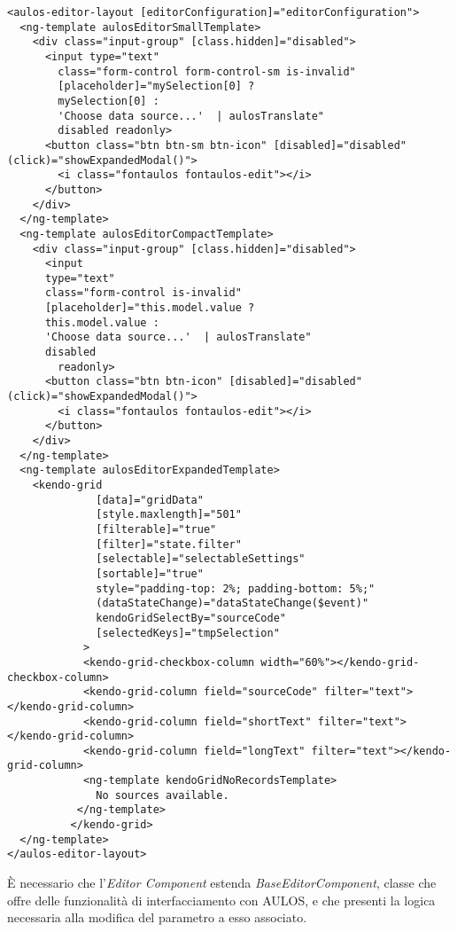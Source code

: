 \begin{lstlisting}[caption={source-editor.component.html},style=html]
<aulos-editor-layout [editorConfiguration]="editorConfiguration">
  <ng-template aulosEditorSmallTemplate>
    <div class="input-group" [class.hidden]="disabled">
      <input type="text" 
        class="form-control form-control-sm is-invalid"
        [placeholder]="mySelection[0] ? 
        mySelection[0] : 
        'Choose data source...'  | aulosTranslate" 
        disabled readonly>
      <button class="btn btn-sm btn-icon" [disabled]="disabled" (click)="showExpandedModal()">
        <i class="fontaulos fontaulos-edit"></i>
      </button>
    </div>
  </ng-template>
  <ng-template aulosEditorCompactTemplate>
    <div class="input-group" [class.hidden]="disabled">
      <input 
      type="text" 
      class="form-control is-invalid" 
      [placeholder]="this.model.value ? 
      this.model.value : 
      'Choose data source...'  | aulosTranslate" 
      disabled
        readonly>
      <button class="btn btn-icon" [disabled]="disabled" (click)="showExpandedModal()">
        <i class="fontaulos fontaulos-edit"></i>
      </button>
    </div>
  </ng-template>
  <ng-template aulosEditorExpandedTemplate>
    <kendo-grid
              [data]="gridData"
              [style.maxlength]="501"
              [filterable]="true"
              [filter]="state.filter"
              [selectable]="selectableSettings"
              [sortable]="true"
              style="padding-top: 2%; padding-bottom: 5%;"
              (dataStateChange)="dataStateChange($event)"
              kendoGridSelectBy="sourceCode"
              [selectedKeys]="tmpSelection"
            >
            <kendo-grid-checkbox-column width="60%"></kendo-grid-checkbox-column>
            <kendo-grid-column field="sourceCode" filter="text"></kendo-grid-column>
            <kendo-grid-column field="shortText" filter="text"></kendo-grid-column>
            <kendo-grid-column field="longText" filter="text"></kendo-grid-column>
            <ng-template kendoGridNoRecordsTemplate>
              No sources available.
           </ng-template>
          </kendo-grid>
  </ng-template>
</aulos-editor-layout>
\end{lstlisting}
È necessario che l'\textit{Editor Component} estenda \textit{BaseEditorComponent}, classe che offre delle funzionalità di interfacciamento con AULOS, e che presenti la logica necessaria alla modifica del parametro a esso associato.

